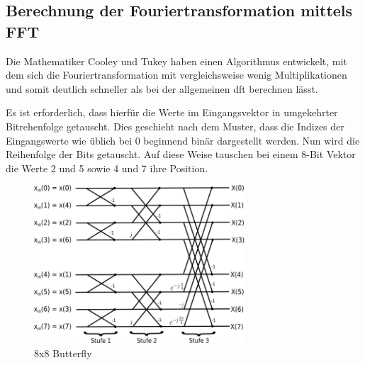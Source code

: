 \subsection{Berechnung der Fouriertransformation mittels FFT}
Die Mathematiker Cooley und Tukey haben einen Algorithmus entwickelt, mit dem sich die Fouriertransformation mit vergleichsweise wenig Multiplikationen
und somit deutlich schneller als bei der allgemeinen \gls{dft} berechnen lässt.

Es ist erforderlich, dass hierfür die Werte im Eingangsvektor in umgekehrter Bitrehenfolge getauscht. Dies geschieht nach dem Muster, dass die Indizes der Eingangswerte wie
üblich bei 0 beginnend binär dargestellt werden. Nun wird die Reihenfolge der Bits getauscht. Auf diese Weise tauschen bei einem 8-Bit Vektor die
Werte 2 und 5 sowie 4 und 7 ihre Position.


\begin{figure}[htbp]
 \centering
 \includegraphics[width=0.7\textwidth]{img/Butterfly.png}
 \caption{8x8 Butterfly}
 \label{pic:Butterfly}
\end{figure}
